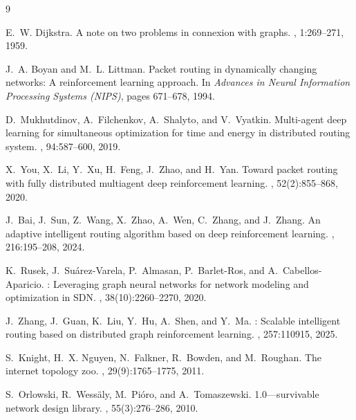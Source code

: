 \documentclass[10pt,twocolumn,letterpaper]{article}
\begin{document}
{\small

\begin{thebibliography}{9}

E.~W. Dijkstra.
\newblock A note on two problems in connexion with graphs.
, 1:269--271, 1959.

J.~A. Boyan and M.~L. Littman.
\newblock Packet routing in dynamically changing networks: A reinforcement
  learning approach.
\newblock In {\em Advances in Neural Information Processing Systems (NIPS)},
  pages 671--678, 1994.

D.~Mukhutdinov, A.~Filchenkov, A.~Shalyto, and V.~Vyatkin.
\newblock Multi-agent deep learning for simultaneous optimization for time and
  energy in distributed routing system.
, 94:587--600, 2019.

X.~You, X.~Li, Y.~Xu, H.~Feng, J.~Zhao, and H.~Yan.
\newblock Toward packet routing with fully distributed multiagent deep
  reinforcement learning.
,
  52(2):855--868, 2020.

J.~Bai, J.~Sun, Z.~Wang, X.~Zhao, A.~Wen, C.~Zhang, and J.~Zhang.
\newblock An adaptive intelligent routing algorithm based on deep reinforcement
  learning.
, 216:195--208, 2024.

K.~Rusek, J.~Su{\'a}rez-Varela, P.~Almasan, P.~Barlet-Ros, and
  A.~Cabellos-Aparicio.
: Leveraging graph neural networks for network modeling and
  optimization in {SDN}.
,
  38(10):2260--2270, 2020.

J.~Zhang, J.~Guan, K.~Liu, Y.~Hu, A.~Shen, and Y.~Ma.
: Scalable intelligent routing based on distributed graph
  reinforcement learning.
, 257:110915, 2025.

S.~Knight, H.~X. Nguyen, N.~Falkner, R.~Bowden, and M.~Roughan.
\newblock The internet topology zoo.
,
  29(9):1765--1775, 2011.

S.~Orlowski, R.~Wess{\"a}ly, M.~Pi{\'o}ro, and A.~Tomaszewski.
 1.0---survivable network design library.
, 55(3):276--286, 2010.

\end{thebibliography}
}
\end{document}
